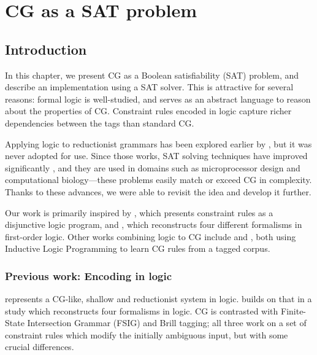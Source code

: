 \chapter{CG as a SAT problem}

\section{Introduction}

In this chapter, we present CG %
as a Boolean satisfiability (SAT) problem, and describe an implementation
using a SAT solver. This is attractive for several reasons: formal logic is
well-studied, and serves as an abstract language to reason about the
properties of CG. Constraint rules encoded in logic capture richer
dependencies between the tags than standard CG.

Applying logic to reductionist grammars has been explored earlier by \cite{lager98,lager_nivre01}, but it was never adopted for use.
Since those works, SAT solving techniques have improved significantly \cite{marques_silva2010}, and they are used in domains such as microprocessor design and computational 
biology---these problems easily match or exceed CG in complexity. 
Thanks to these advances, we were able to revisit the idea and develop it
further. 

Our work is primarily inspired by \cite{lager98}, which presents constraint
rules as a disjunctive logic program, and \cite{lager_nivre01}, which
reconstructs four different formalisms in first-order logic.
Other works combining logic to CG include
\cite{lindberg_eineborg98ilp} and \cite{asfrent14}, both using Inductive Logic Programming to learn CG rules from a tagged corpus.

\subsection{Previous work: Encoding in logic}\label{encoding-in-logic}

\cite{lager98} represents a CG-like, shallow and reductionist system in
logic. \cite{lager_nivre01} builds on that in a study which reconstructs
four formalisms in logic. CG is contrasted with Finite-State
Intersection Grammar (FSIG) and Brill tagging; all three work on a set
of constraint rules which modify the initially ambiguous input, but with some crucial
differences.

